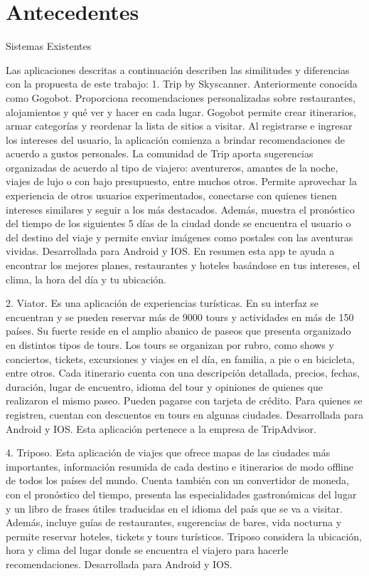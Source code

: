 \chapter{Antecedentes}




Sistemas Existentes 

Las aplicaciones descritas a continuación describen las similitudes y diferencias con la propuesta de este trabajo:
1. Trip by Skyscanner. Anteriormente conocida como Gogobot. Proporciona recomendaciones personalizadas sobre restaurantes, alojamientos y qué ver y hacer en cada lugar. Gogobot permite crear itinerarios, armar categorías y reordenar la lista de sitios a visitar. Al registrarse e ingresar los intereses del usuario, la aplicación comienza a brindar recomendaciones de acuerdo a gustos personales. La comunidad de Trip aporta sugerencias organizadas de acuerdo al tipo de viajero: aventureros, amantes de la noche, viajes de lujo o con bajo presupuesto, entre muchos otros. Permite aprovechar la experiencia de otros usuarios experimentados, conectarse con quienes tienen intereses similares y seguir a los más destacados. Además, muestra el pronóstico del tiempo de los siguientes 5 días de la ciudad donde se encuentra el usuario o del destino del viaje y permite enviar imágenes como postales con las aventuras vividas. Desarrollada para Android y IOS. En resumen esta app te ayuda a encontrar los mejores planes, restaurantes y hoteles basándose en tus intereses, el clima, la hora del día y tu ubicación.

2. Viator. Es una aplicación de experiencias turísticas. En su interfaz se encuentran y se pueden reservar más de 9000 tours y actividades en más de 150 países. Su fuerte reside en el amplio abanico de paseos que presenta organizado en distintos tipos de tours. Los tours se organizan por rubro, como shows y conciertos, tickets, excursiones y viajes en el día, en familia, a pie o en bicicleta, entre otros. Cada itinerario cuenta con una descripción detallada, precios, fechas, duración, lugar de encuentro, idioma del tour y opiniones de quienes que realizaron el mismo paseo. Pueden pagarse con tarjeta de crédito. Para quienes se registren, cuentan con descuentos en tours en algunas ciudades. Desarrollada para Android y IOS. Esta aplicación pertenece a la empresa de TripAdvisor.

4. Triposo. Esta aplicación de viajes que ofrece mapas de las ciudades más importantes, información resumida de cada destino e itinerarios de modo offline de todos los países del mundo. Cuenta también con un convertidor de moneda, con el pronóstico del tiempo, presenta las especialidades gastronómicas del lugar y un libro de frases útiles traducidas en el idioma del país que se va a visitar. Además, incluye guías de restaurantes, sugerencias de bares, vida nocturna y permite reservar hoteles, tickets y tours turísticos. Triposo considera la ubicación, hora y clima del lugar donde se encuentra el viajero para hacerle recomendaciones. Desarrollada para Android y IOS.

